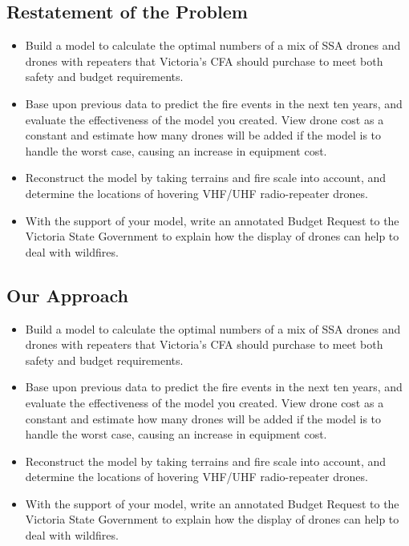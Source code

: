 \documentclass{mcmthesis}
\begin{document}
\subsection{Restatement of the Problem}
\begin{itemize}
	\item Build a model to calculate the optimal numbers of a mix of SSA drones and drones with repeaters that Victoria’s CFA should purchase to meet both safety and budget requirements. 
	
	\item Base upon previous data to predict the fire events in the next ten years, and evaluate the effectiveness of the model you created. View drone cost as a constant and estimate how many drones will be added if the model is to handle the worst case, causing an increase in equipment cost.
	
	\item Reconstruct the model by taking terrains and fire scale into account, and determine the locations of hovering VHF/UHF radio-repeater drones.
	
	\item With the support of your model, write an annotated Budget Request to the Victoria State Government to explain how the display of drones can help to deal with wildfires. 
\end{itemize}

\subsection{Our Approach}

\begin{itemize}
\item Build a model to calculate the optimal numbers of a mix of SSA drones and drones with repeaters that Victoria’s CFA should purchase to meet both safety and budget requirements. 

\item Base upon previous data to predict the fire events in the next ten years, and evaluate the effectiveness of the model you created. View drone cost as a constant and estimate how many drones will be added if the model is to handle the worst case, causing an increase in equipment cost.

\item Reconstruct the model by taking terrains and fire scale into account, and determine the locations of hovering VHF/UHF radio-repeater drones.

\item With the support of your model, write an annotated Budget Request to the Victoria State Government to explain how the display of drones can help to deal with wildfires. 

\end{itemize}
\end{document}
